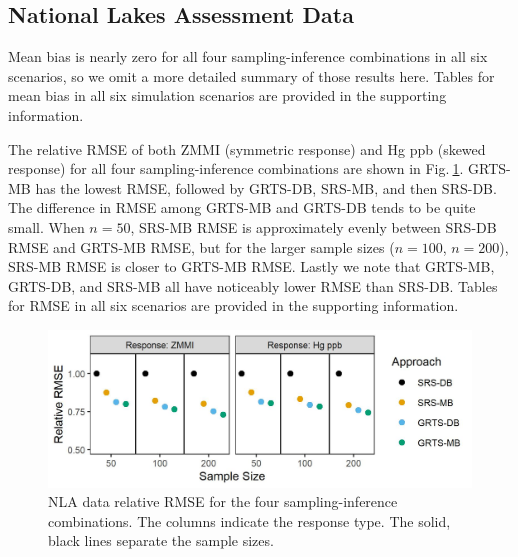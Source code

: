 \documentclass[]{elsarticle} %
\begin{document}
\hypertarget{sec:r_app}{%
\subsection{National Lakes Assessment Data}\label{sec:r_app}}

Mean bias is nearly zero for all four sampling-inference combinations in
all six scenarios, so we omit a more detailed summary of those results
here. Tables for mean bias in all six simulation scenarios are provided
in the supporting information.

The relative RMSE of both ZMMI (symmetric response) and Hg ppb (skewed
response) for all four sampling-inference combinations are shown in
Fig.\(~\)\ref{fig:data_rmspe_eff}. GRTS-MB has the lowest RMSE, followed
by GRTS-DB, SRS-MB, and then SRS-DB. The difference in RMSE among
GRTS-MB and GRTS-DB tends to be quite small. When \(n = 50\), SRS-MB
RMSE is approximately evenly between SRS-DB RMSE and GRTS-MB RMSE, but
for the larger sample sizes (\(n = 100\), \(n = 200\)), SRS-MB RMSE is
closer to GRTS-MB RMSE. Lastly we note that GRTS-MB, GRTS-DB, and SRS-MB
all have noticeably lower RMSE than SRS-DB. Tables for RMSE in all six
scenarios are provided in the supporting information.

\begin{figure}
  \centering
  \includegraphics[width = 1\linewidth]{figures/data_rmspe_eff.jpeg}
  \caption{NLA data relative RMSE for the four sampling-inference combinations. The columns indicate the response type. The solid, black lines separate the sample sizes.}
  \label{fig:data_rmspe_eff}
\end{figure}
\end{document}
